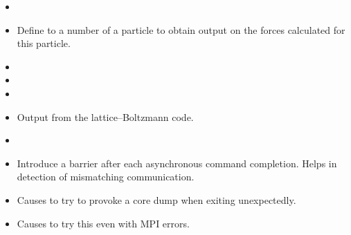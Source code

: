 \begin{itemize}
\item {}
\item {} Define to a number of a particle to
  obtain output on the forces calculated for this particle.
\item {}
\item {}
\item {}
\item {} Output from the lattice--Boltzmann code.
\item {}
\item {} Introduce a barrier after each
  asynchronous command completion. Helps in detection of mismatching
  communication.
\item {} Causes \es{} to try to provoke a core dump
  when exiting unexpectedly.
\item {} Causes \es{} to try this even with MPI errors.
\end{itemize}

